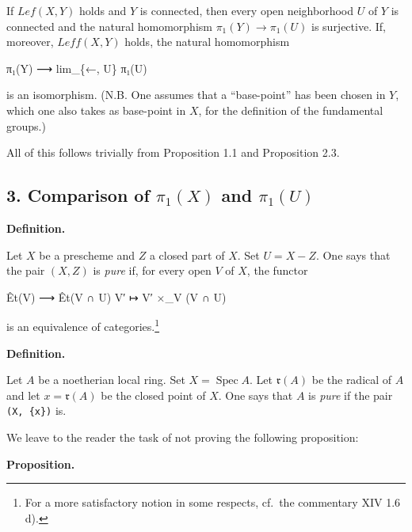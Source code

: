 \documentclass[
]{article}
\newenvironment{Shaded}{}{}
\newcommand{\NormalTok}[1]{#1}
\begin{document}
If \(Lef(X, Y)\) holds and \(Y\) is connected, then every open
neighborhood \(U\) of \(Y\) is connected and the natural homomorphism
\(\pi_{1}(Y) \to \pi_{1}(U)\) is surjective. If, moreover,
\(Leff(X, Y)\) holds, the natural homomorphism

\begin{Shaded}
\begin{Highlighting}[]
\NormalTok{π₁(Y) ⟶ lim\_\{←, U\} π₁(U)}
\end{Highlighting}
\end{Shaded}

is an isomorphism. (N.B. One assumes that a ``base-point'' has been
chosen in \(Y\), which one also takes as base-point in \(X\), for the
definition of the fundamental groups.)

All of this follows trivially from Proposition 1.1 and Proposition 2.3.

\subsection{\texorpdfstring{3. Comparison of \(\pi_{1}(X)\) and
\(\pi_{1}(U)\)}{3. Comparison of \textbackslash pi\_\{1\}(X) and \textbackslash pi\_\{1\}(U)}}\label{comparison-of-pi_1x-and-pi_1u}

\textbf{Definition.}

Let \(X\) be a prescheme and \(Z\) a closed part of \(X\). Set
\(U = X - Z\). One says that the pair \((X, Z)\) is \emph{pure} if, for
every open \(V\) of \(X\), the functor

\begin{Shaded}
\begin{Highlighting}[]
\NormalTok{Êt(V) ⟶ Êt(V ∩ U)}
\NormalTok{V′ ↦ V′ ×\_V (V ∩ U)}
\end{Highlighting}
\end{Shaded}

is an equivalence of categories.\footnote{For a more satisfactory notion
  in some respects, cf.~the commentary XIV 1.6 d).}

\textbf{Definition.}

Let \(A\) be a noetherian local ring. Set \(X = \operatorname{Spec} A\).
Let \(\mathfrak{r}(A)\) be the radical of \(A\) and let
\(x = \mathfrak{r}(A)\) be the closed point of \(X\). One says that
\(A\) is \emph{pure} if the pair \texttt{(X,\ \{x\})} is.

We leave to the reader the task of not proving the following
proposition:

\textbf{Proposition.}
\end{document}
